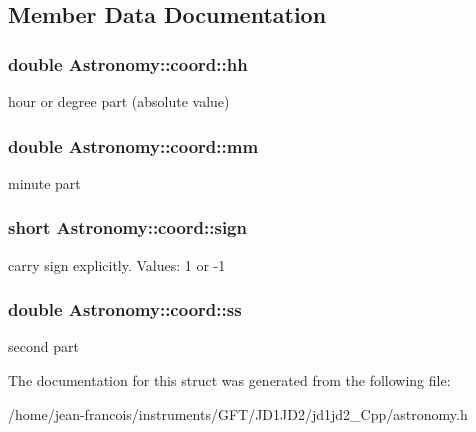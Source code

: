 \subsection{Member Data Documentation}
\hypertarget{struct_astronomy_1_1coord_a88e90750b0c24f523003b7a85078ea11}{
\subsubsection[{hh}]{\setlength{\rightskip}{0pt plus 5cm}double Astronomy\-::coord\-::hh}}\label{struct_astronomy_1_1coord_a88e90750b0c24f523003b7a85078ea11}
hour or degree part (absolute value) \hypertarget{struct_astronomy_1_1coord_ac3e70ee54e58ae0f61fc5f0612d5bbcc}{
\subsubsection[{mm}]{\setlength{\rightskip}{0pt plus 5cm}double Astronomy\-::coord\-::mm}}\label{struct_astronomy_1_1coord_ac3e70ee54e58ae0f61fc5f0612d5bbcc}
minute part \hypertarget{struct_astronomy_1_1coord_a6eb7cb493d4a55ef75f6297f12e19fa6}{
\subsubsection[{sign}]{\setlength{\rightskip}{0pt plus 5cm}short Astronomy\-::coord\-::sign}}\label{struct_astronomy_1_1coord_a6eb7cb493d4a55ef75f6297f12e19fa6}
carry sign explicitly. Values\-: 1 or -\/1 \hypertarget{struct_astronomy_1_1coord_a1d385ad7c94b73fd827a9b647530b228}{
\subsubsection[{ss}]{\setlength{\rightskip}{0pt plus 5cm}double Astronomy\-::coord\-::ss}}\label{struct_astronomy_1_1coord_a1d385ad7c94b73fd827a9b647530b228}
second part 

The documentation for this struct was generated from the following file\-:\begin{DoxyCompactItemize}
\item 
/home/jean-\/francois/instruments/\-G\-F\-T/\-J\-D1\-J\-D2/jd1jd2\-\_\-\-Cpp/astronomy.\-h\end{DoxyCompactItemize}
